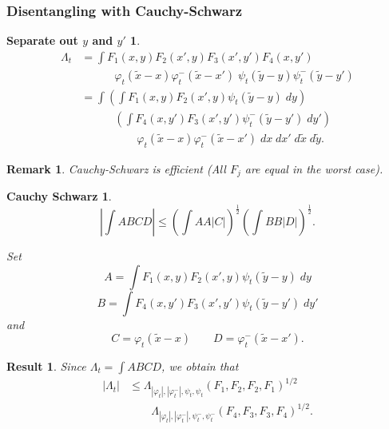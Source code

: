 \documentclass[usenames,dvipsnames,12pt]{beamer}
\newtheorem*{collectyvariables}{Separate out $y$ and $y'$}
\newtheorem*{cauchyschwarz}{Cauchy Schwarz}
\newtheorem*{remark}{Remark}
\newtheorem*{result}{Result}
\begin{document}
\begin{frame}
    \frametitle{Disentangling with Cauchy-Schwarz}

    \small

    \begin{collectyvariables}
    \vspace{-0.8em}
    \begin{align*}
        \Lambda_t &= \int F_1(x,y) F_2(x',y) F_3(x',y') F_4(x,y')\\
        &\quad\quad\quad \varphi_t(\tilde{x} - x) \varphi_t^-(\tilde{x} - x')\; \psi_t(\tilde{y} - y) \psi_t^-(\tilde{y} - y')\\
        &= \int \left( \int F_1(x,y) F_2(x',y) \psi_t(\tilde{y} - y)\; dy \right)\\
        &\quad\quad\quad \left( \int F_4(x,y') F_3(x',y') \psi_t^-(\tilde{y} - y')\; dy' \right)\\
        &\quad\quad\quad\quad\quad \varphi_t(\tilde{x} - x) \varphi_t^-(\tilde{x} - x')\; dx\; dx'\; d\tilde{x}\; d\tilde{y}.
    \end{align*}

    \end{collectyvariables}

    \pause

    \begin{remark}
        Cauchy-Schwarz is efficient (All $F_j$ are equal in the worst case).
    \end{remark}
\end{frame}

\begin{frame}

    \begin{cauchyschwarz}
        \footnotesize

        \[ \left| \int A B C D \right| \leq \left( \int A A |C| \right)^{\frac{1}{2}} \left( \int B B |D| \right)^{\frac{1}{2}}. \]

        \pause

        Set
        \[ A = \int F_1(x,y) F_2(x',y) \psi_t(\tilde{y} - y)\; dy \]
        \[ B = \int F_4(x,y') F_3(x',y') \psi_t(\tilde{y} - y')\; dy' \]
        and
        \[ C = \varphi_t(\tilde{x} - x) \quad\quad D = \varphi_t^-(\tilde{x} - x'). \]
    \end{cauchyschwarz}

    \pause
    
    \begin{result}
        \footnotesize

        Since $\Lambda_t = \int A B C D$, we obtain that
        \vspace{-0.8em}
        \begin{align*}
            |\Lambda_t| &\leq \Lambda_{|\varphi_t|, |\varphi_t^-|, \psi_t, \psi_t}(F_1,F_2,F_2,F_1)^{1/2}\\
            &\quad\quad \Lambda_{|\varphi_t|, |\varphi_t^-|, \psi_t^-, \psi_t^-}(F_4,F_3,F_3,F_4)^{1/2}.
        \end{align*}
    \end{result}
\end{frame}
\end{document}
